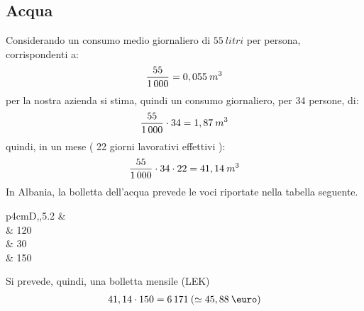 \subsection[Acqua]{Acqua}
Considerando un consumo medio giornaliero di $ 55 \: litri $ \cite{ConsumoAcqua} per persona, corrispondenti a:
	\begin{equation}
	\label{eq:consumo_acqua_giorno_dipendente}
	\begin{split}
		\frac{55}{1\thinspace 000} = 0,055 \: m^3
	\end{split}
	\end{equation}	
per la nostra azienda si stima, quindi un consumo giornaliero, per 34 persone, di:
	\begin{equation}
	\label{eq:consumo_acqua_giorno_azienda}
	\begin{split}
		\frac{55}{1\thinspace 000} \cdot 34 = 1,87 \: m^3
	\end{split}
	\end{equation}	
quindi, in un mese ( 22 giorni lavorativi effettivi ):	
	\begin{equation}
	\label{eq:consumo_acqua_giorno_azienda}
	\begin{split}
		\frac{55}{1\thinspace 000} \cdot 34 \cdot 22 = 41,14 \: m^3
	\end{split}
	\end{equation}
	\clearpage	
In Albania, la bolletta dell'acqua prevede le voci riportate nella tabella seguente.
\begin{savenotes}
\begin{table}[htb]
\centering
 \caption{Costo \si{m^3} acqua}
 \begin{tabular}{p{4cm}D{,}{,}{5.2}}
 \toprule
 	& \\
 \midrule
	 & 120\\
	 & 30\\
 \midrule
	 & 150\\	
 \bottomrule
 \end{tabular} 
\end{table}
\end{savenotes}
\newline
Si prevede, quindi, una bolletta mensile (LEK)\cite{CostoAcqua}
	\begin{equation}
	\label{eq:bolletta_acqua_azienda}
	\begin{split}
		41,14 \cdot 150 = 6\thinspace 171 \: ( \simeq 45,88 \: \mbox{\euro}) 
	\end{split}
	\end{equation}	
